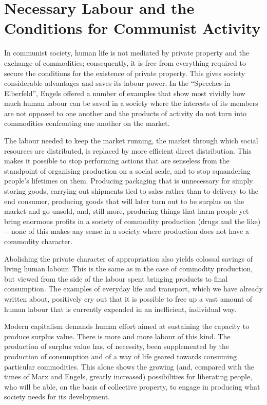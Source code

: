 \documentclass[../main]{subfiles}
\begin{document}
\ifSubfilesClassLoaded{\setcounter{page}{36}}{}
\section{Necessary Labour and the Conditions for Communist Activity}
\label{sec:06_necessary_labour}

In communist society, human life is not mediated by private property and the exchange of commodities; consequently, it is free from everything required to secure the conditions for the existence of private property. This gives society considerable advantages and saves its labour power. In the “Speeches in Elberfeld”, Engels offered a number of examples that show most vividly how much human labour can be saved in a society where the interests of its members are not opposed to one another and the products of activity do not turn into commodities confronting one another on the market.

The labour needed to keep the market running, the market through which social resources are distributed, is replaced by more efficient direct distribution. This makes it possible to stop performing actions that are senseless from the standpoint of organising production on a social scale, and to stop squandering people’s lifetimes on them. Producing packaging that is unnecessary for simply storing goods, carrying out shipments tied to sales rather than to delivery to the end consumer, producing goods that will later turn out to be surplus on the market and go unsold, and, still more, producing things that harm people yet bring enormous profits in a society of commodity production (drugs and the like)—none of this makes any sense in a society where production does not have a commodity character.

Abolishing the private character of appropriation also yields colossal savings of living human labour. This is the same as in the case of commodity production, but viewed from the side of the labour spent bringing products to final consumption. The examples of everyday life and transport, which we have already written about, positively cry out that it is possible to free up a vast amount of human labour that is currently expended in an inefficient, individual way.

Modern capitalism demands human effort aimed at sustaining the capacity to produce surplus value. There is more and more labour of this kind. The production of surplus value has, of necessity, been supplemented by the production of consumption and of a way of life geared towards consuming particular commodities. This alone shows the growing (and, compared with the times of Marx and Engels, greatly increased) possibilities for liberating people, who will be able, on the basis of collective property, to engage in producing what society needs for its development.
\end{document}
